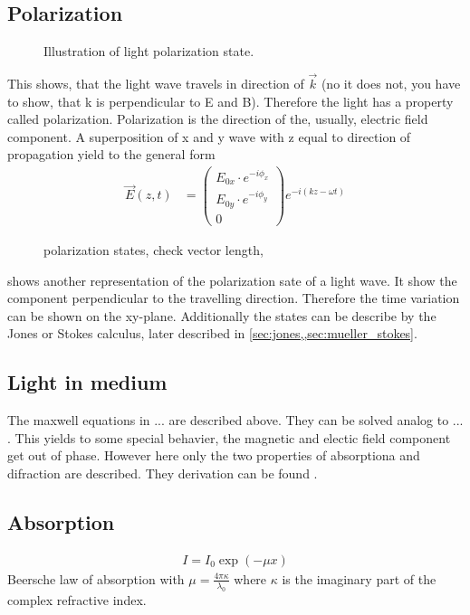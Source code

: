 \subsection{Polarization}
% 
\begin{figure}[!t]
\centering
\def\tikzwidth{\textwidth}
\label{fig:polarization_state}
\caption{Illustration of light polarization state.}
\end{figure}
% 
This shows, that the light wave travels in direction of $\vec{k}$ (no it does not, you have to show, that k is perpendicular to E and B).
Therefore the light has a property called polarization.
Polarization is the direction of the, usually, electric field component.
% 
A superposition of x and y wave with z equal to direction of propagation yield to the general form
\begin{align}
\vec{E}(z,t) &= \begin{pmatrix} E_{0x} \cdot e^{ -i \phi_x } \\ E_{0y} \cdot e^{ -i \phi_y } \\ 0 \end{pmatrix}
e^{ -i (kz - \omega t)}
\end{align}
%
\begin{figure}[!t]
\centering
\tikzset{external/export=false}

\caption{polarization states, check vector length,} 
\label{fig:polarization_state_vectors}
\end{figure}
%
 shows another representation of the polarization sate of a light wave.
It show the component perpendicular to the travelling direction.
Therefore the time variation can be shown on the xy-plane.
Additionally the states can be describe by the Jones or Stokes calculus, later described in \cref{sec:jones,,sec:mueller_stokes}.
% 
% 
% 
\subsection{Light in medium}
% 
The maxwell equations in ... are described above. They can be solved analog to ... . This yields to some special behavier, \eg the magnetic and electic field component get out of phase.
However here only the two properties of absorptiona and difraction are described.
They derivation can be found \eg \cite{demtroeder2, Fliebach2012}.
% 
\subsection{Absorption}
% 
\begin{align}
    I = I_0 \exp(-\mu x)
\end{align}
% 
Beersche law of absorption with $\mu = \frac{4\pi \kappa}{\lambda_0}$ where $\kappa$ is the imaginary part of the complex refractive index.
% 
